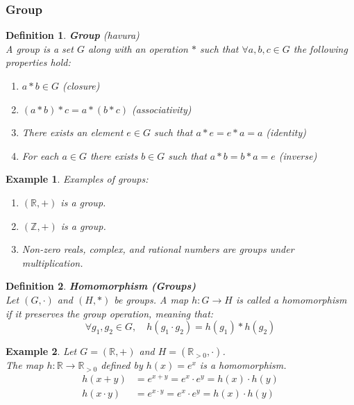 \documentclass[11pt]{book} %
\newtheorem{definition}{Definition}[section]
\newtheorem*{example*}{Example}
\begin{document}
\subsubsection{Group}
\begin{definition}{\textbf{Group} (havura)} \\
A group is a set \(G\) along with an operation \(*\) such that $\forall a, b, c \in G$ the following properties hold:
\begin {enumerate}
    \item \(a * b \in G\) (closure)
    \item \((a * b) * c = a * (b * c)\) (associativity)
    \item There exists an element \(e \in G\) such that \(a * e = e * a = a\) (identity)
    \item For each \(a \in G\) there exists \(b \in G\) such that \(a * b = b * a = e\) (inverse)
\end{enumerate}
\end{definition}

\begin{example*}
Examples of groups:
\begin{enumerate}
\item \( (\mathbb{R}, +) \) is a group.
\item \( (\mathbb{Z}, +) \) is a group.
\item Non-zero reals, complex, and rational numbers are groups under multiplication.
\end{enumerate}
\end{example*}

\begin{definition}{\textbf{Homomorphism (Groups)}} \\
    Let \( (G, \cdot) \) and \( (H, \ast) \) be groups. A map \( h: G \to H \) is called a homomorphism if it preserves the group operation, meaning that: 
    \begin{equation*}
        \forall g_1, g_2 \in G, \quad h(g_1 \cdot g_2) = h(g_1) \ast h(g_2)
    \end{equation*}
\end{definition}

\begin{example*} Let \( G = (\mathbb{R}, +) \) and \( H = (\mathbb{R}_{>0}, \cdot) \). \\
    The map \( h: \mathbb{R} \to \mathbb{R}_{>0} \) defined by \( h(x) = e^x \) is a homomorphism.
    \begin{align*}
        h(x + y) &= e^{x + y} = e^x \cdot e^y = h(x) \cdot h(y) \\
        h(x \cdot y) &= e^{x \cdot y} = e^x \cdot e^y = h(x) \cdot h(y)
    \end{align*}
\end{example*}
\end{document}
